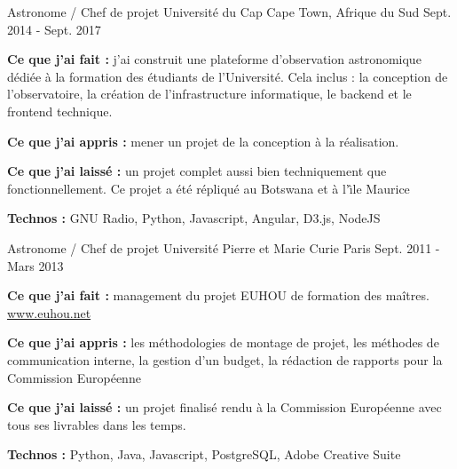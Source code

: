 \begin{cventries}
  \cventry
    {Astronome / Chef de projet} %
    {Université du Cap} %
    {Cape Town, Afrique du Sud} %
    {Sept. 2014 - Sept. 2017} %
    {
      \begin{cvitems} %
        \item {\textbf{Ce que j'ai fait :} j'ai construit une plateforme d'observation astronomique dédiée à la formation des étudiants de l'Université. Cela inclus : la conception de l'observatoire, la création de l'infrastructure informatique, le backend et le frontend technique.}
        \item {\textbf{Ce que j'ai appris :} mener un projet de la conception à la réalisation.}
        \item {\textbf{Ce que j'ai laissé :} un projet complet aussi bien techniquement que fonctionnellement. Ce projet a été répliqué au Botswana et à l'\^\i le Maurice}
        \item {\textbf{Technos :} GNU Radio, Python, Javascript, Angular, D3.js, NodeJS}
      \end{cvitems}
    }

  \cventry
    {Astronome / Chef de projet} %
    {Université Pierre et Marie Curie} %
    {Paris} %
    {Sept. 2011 - Mars 2013} %
    {
      \begin{cvitems} %
        \item {\textbf{Ce que j'ai fait :} management du projet EUHOU de formation des maîtres. \url{www.euhou.net}}
        \item {\textbf{Ce que j'ai appris :} les méthodologies de montage de projet, les méthodes de communication interne, la gestion d'un budget, la rédaction de rapports pour la Commission Européenne}
        \item {\textbf{Ce que j'ai laissé :} un projet finalisé rendu à la Commission Européenne avec tous ses livrables dans les temps. }
        \item {\textbf{Technos :} Python, Java, Javascript, PostgreSQL, Adobe Creative Suite}
      \end{cvitems}
    }


\end{cventries}
